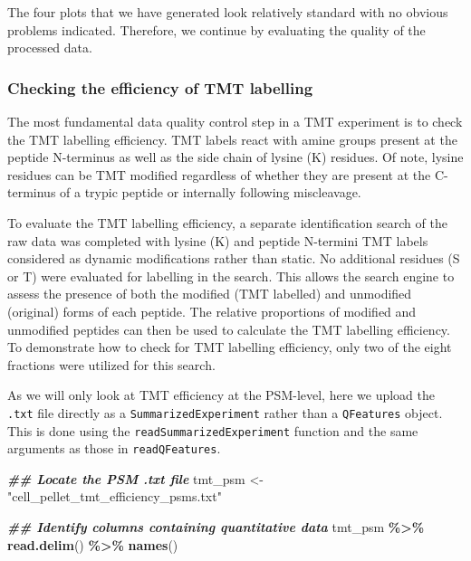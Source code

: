 \documentclass[9pt,a4paper,]{extarticle}
\newenvironment{Shaded}{\begin{snugshade}}{\end{snugshade}}
\newcommand{\DocumentationTok}[1]{\textcolor[rgb]{0.56,0.35,0.01}{\textbf{\textit{#1}}}}
\newcommand{\FunctionTok}[1]{\textcolor[rgb]{0.13,0.29,0.53}{\textbf{#1}}}
\newcommand{\NormalTok}[1]{#1}
\newcommand{\OtherTok}[1]{\textcolor[rgb]{0.56,0.35,0.01}{#1}}
\newcommand{\SpecialCharTok}[1]{\textcolor[rgb]{0.81,0.36,0.00}{\textbf{#1}}}
\newcommand{\StringTok}[1]{\textcolor[rgb]{0.31,0.60,0.02}{#1}}
\begin{document}
The four plots that we have generated look relatively standard with no obvious
problems indicated. Therefore, we continue by evaluating the quality of the
processed data.

\hypertarget{checking-the-efficiency-of-tmt-labelling}{%
\subsubsection{Checking the efficiency of TMT labelling}\label{checking-the-efficiency-of-tmt-labelling}}

The most fundamental data quality control step in a TMT experiment is to check
the TMT labelling efficiency. TMT labels react with amine groups present at the
peptide N-terminus as well as the side chain of lysine (K) residues. Of note,
lysine residues can be TMT modified regardless of whether they are present at the
C-terminus of a trypic peptide or internally following miscleavage.

To evaluate the TMT labelling efficiency, a separate identification search of the
raw data was completed with lysine (K) and peptide N-termini TMT labels
considered as dynamic modifications rather than static. No additional residues
(S or T) were evaluated for labelling in the search. This allows the search
engine to assess the presence of both the modified (TMT labelled) and unmodified
(original) forms of each peptide. The relative proportions of modified and
unmodified peptides can then be used to calculate the TMT labelling efficiency.
To demonstrate how to check for TMT labelling efficiency, only two of the eight
fractions were utilized for this search.

As we will only look at TMT efficiency at the PSM-level, here we upload the \texttt{.txt}
file directly as a \texttt{SummarizedExperiment} rather than a \texttt{QFeatures} object.
This is done using the \texttt{readSummarizedExperiment} function and the same arguments
as those in \texttt{readQFeatures}.

\begin{Shaded}
\begin{Highlighting}[]
\DocumentationTok{\#\# Locate the PSM .txt file}
\NormalTok{tmt\_psm }\OtherTok{\textless{}{-}} \StringTok{"cell\_pellet\_tmt\_efficiency\_psms.txt"}

\DocumentationTok{\#\# Identify columns containing quantitative data}
\NormalTok{tmt\_psm }\SpecialCharTok{\%\textgreater{}\%}
  \FunctionTok{read.delim}\NormalTok{() }\SpecialCharTok{\%\textgreater{}\%}
  \FunctionTok{names}\NormalTok{()}
\end{Highlighting}
\end{Shaded}
\end{document}
